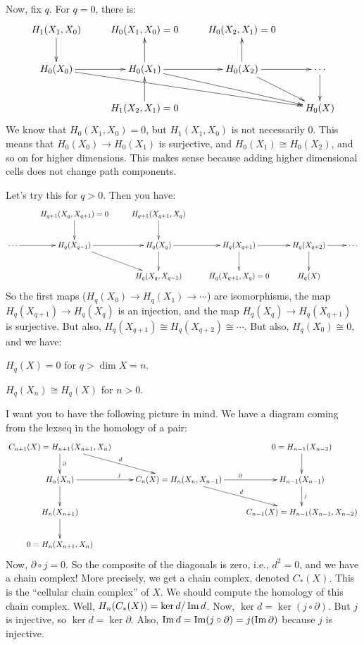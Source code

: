 Now, fix $q$. For $q=0$, there is:
\begin{equation*}
\xymatrix{ H_1(X_1,X_0)\ar[d] & H_0(X_1,X_0)=0 & H_0(X_2,X_1)=0\\
 H_0(X_0)\ar[r]\ar[drrr] & H_0(X_1)\ar[r]\ar[drr]\ar[u] & H_0(X_2)\ar[u]\ar[r]\ar[dr] & \cdots\ar[d]\\
 & H_1(X_2,X_1)=0\ar[u] & & H_0(X)}
\end{equation*}
We know that $ H_0(X_1,X_0)=0$, but $ H_1(X_1,X_0)$ is not necessarily $0$. This means that $ H_0(X_0)\to H_0(X_1)$ is surjective, and $ H_0(X_1)\cong H_0(X_2)$, and so on for higher dimensions. This makes sense because adding higher dimensional cells does not change path components.

Let's try this for $q>0$. Then you have:
\begin{equation*}
\xymatrix{ & H_{q+1}(X_q,X_{q+1})=0\ar[d]& H_{q+1}(X_{q+1},X_q)\ar[d]\\
\ar[r]\cdots & H_q(X_{q-1})\ar[r]\ar[dr] & H_q(X_q)\ar[r]\ar[d] & H_q(X_{q+1})\ar[r]\ar[d] & H_q(X_{q+2})\ar[d]\ar[r] & \cdots\\
& & H_q(X_{q},X_{q-1}) & H_q(X_{q+1},X_q)=0 & H_q(X)}
\end{equation*}
So the first maps ($ H_q(X_0)\to H_q(X_1)\to\cdots$) are isomorphisms, the map $ H_q(X_{q+1})\to H_q(X_q)$ is an injection, and the map $ H_q(X_q)\to H_q(X_{q+1})$ is surjective. But also, $ H_q(X_{q+1})\cong H_q(X_{q+2})\cong \cdots$. But also, $ H_q(X_0)\cong 0$, and we have:
\begin{corollary}
$ H_q(X)=0$ for $q>\dim X=n$.
\end{corollary}
\begin{lemma}
$ H_q(X_n)\cong H_q(X)$ for $n>0$.
\end{lemma}
I want you to have the following picture in mind. We have a diagram coming from the lexseq in the homology of a pair:
\begin{equation*}
\xymatrix{C_{n+1}(X)= H_{n+1}(X_{n+1},X_n)\ar[d]^\partial\ar[dr]^d & & 0= H_{n-1}(X_{n-2})\ar[d]\\
 H_n(X_n)\ar[r]^j\ar[d] & C_n(X)= H_n(X_n,X_{n-1})\ar[r]^\partial\ar[dr]^d & H_{n-1}(X_{n-1})\ar[d]^j\\
 H_n(X_{n+1})\ar[d] & & C_{n-1}(X)= H_{n-1}(X_{n-1},X_{n-2})\\
0 = H_n(X_{n+1},X_n)}
\end{equation*}
Now, $\partial\circ j=0$. So the composite of the diagonals is zero, i.e., $d^2=0$, and we have a chain complex! More precisely, we get a chain complex, denoted $C_\ast(X)$. This is the ``cellular chain complex'' of $X$. We should compute the homology of this chain complex. Well, $ H_n(C_\ast(X))=\ker d/\operatorname{Im} d$. Now, $\ker d=\ker (j\circ\partial)$. But $j$ is injective, so $\ker d=\ker\partial$. Also, $\operatorname{Im} d=\operatorname{Im}(j\circ\partial)=j(\operatorname{Im}\partial)$ because $j$ is injective.

